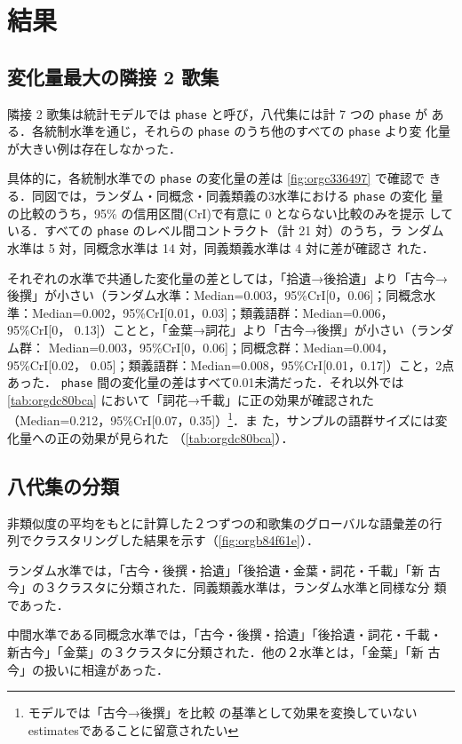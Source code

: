 \documentclass[submit]{ipsj}
\renewcommand{\ref}{\cref}
\begin{document}
\section{結果\label{org9b67df1}}
\label{sec:org45f0015}
\subsection{変化量最大の隣接 2 歌集\label{org276229b}}
\label{sec:orge35ca3e}
隣接 2 歌集は統計モデルでは \texttt{phase} と呼び，八代集には計 7 つの \texttt{phase} が
ある．各統制水準を通じ，それらの \texttt{phase} のうち他のすべての \texttt{phase} より変
化量が大きい例は存在しなかった．

具体的に，各統制水準での \texttt{phase} の変化量の差は \ref{fig:orgc336497} で確認で
きる．同図では，ランダム・同概念・同義類義の3水準における \texttt{phase} の変化
量の比較のうち，95\% の信用区間(CrI)で有意に 0 とならない比較のみを提示
している．すべての \texttt{phase} のレベル間コントラクト（計 21 対）のうち，ラ
ンダム水準は 5 対，同概念水準は 14 対，同義類義水準は 4 対に差が確認さ
れた．

それぞれの水準で共通した変化量の差としては，「拾遺→後拾遺」より「古今→
後撰」が小さい（ランダム水準：Median=0.003，95\%CrI[0，0.06]；同概念水
準：Median=0.002，95\%CrI[0.01，0.03]；類義語群：Median=0.006，95\%CrI[0，
0.13]）ことと，「金葉→詞花」より「古今→後撰」が小さい（ランダム群：
Median=0.003，95\%CrI[0，0.06]；同概念群：Median=0.004，95\%CrI[0.02，
0.05]；類義語群：Median=0.008，95\%CrI[0.01，0.17]）こと，2点あった．
\texttt{phase} 間の変化量の差はすべて0.01未満だった．それ以外では
\ref{tab:orgdc80bca} において「詞花→千載」に正の効果が確認された
（Median=0.212，95\%CrI[0.07，0.35]）\footnote{モデルでは「古今→後撰」を比較
の基準として効果を変換していないestimatesであることに留意されたい}．ま
た，サンプルの語群サイズには変化量への正の効果が見られた
（\ref{tab:orgdc80bca}）．
\subsection{八代集の分類\label{org0e8b46f}}
\label{sec:orge3dd31e}
非類似度の平均をもとに計算した２つずつの和歌集のグローバルな語彙差の行
列でクラスタリングした結果を示す（\ref{fig:orgb84f61e}）．

ランダム水準では，「古今・後撰・拾遺」「後拾遺・金葉・詞花・千載」「新
古今」の３クラスタに分類された．同義類義水準は，ランダム水準と同様な分
類であった．

中間水準である同概念水準では，「古今・後撰・拾遺」「後拾遺・詞花・千載・
新古今」「金葉」の３クラスタに分類された．他の２水準とは，「金葉」「新
古今」の扱いに相違があった．
\end{document}
